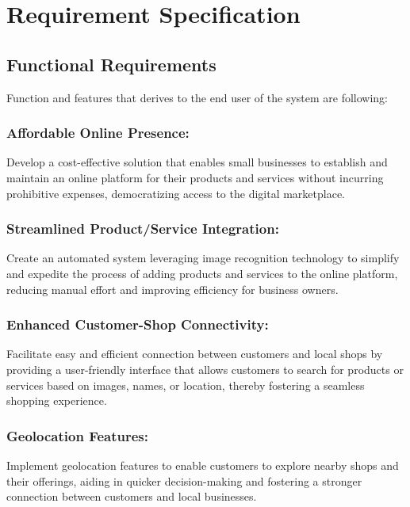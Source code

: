 
\chapter{Requirement Specification} %

\label{Chapter2} %


\section{Functional Requirements}
Function and features that derives to the end user of the system are following:

\subsection{Affordable Online Presence:} 
Develop a cost-effective solution that enables small businesses to establish and maintain an online platform for their products and services without incurring prohibitive expenses, democratizing access to the digital marketplace.

\subsection{Streamlined Product/Service Integration:} 
Create an automated system leveraging image recognition technology to simplify and expedite the process of adding products and services to the online platform, reducing manual effort and improving efficiency for business owners.

\subsection{Enhanced Customer-Shop Connectivity:} 
Facilitate easy and efficient connection between customers and local shops by providing a user-friendly interface that allows customers to search for products or services based on images, names, or location, thereby fostering a seamless shopping experience.

\subsection{Geolocation Features:} 
Implement geolocation features to enable customers to explore nearby shops and their offerings, aiding in quicker decision-making and fostering a stronger connection between customers and local businesses.


